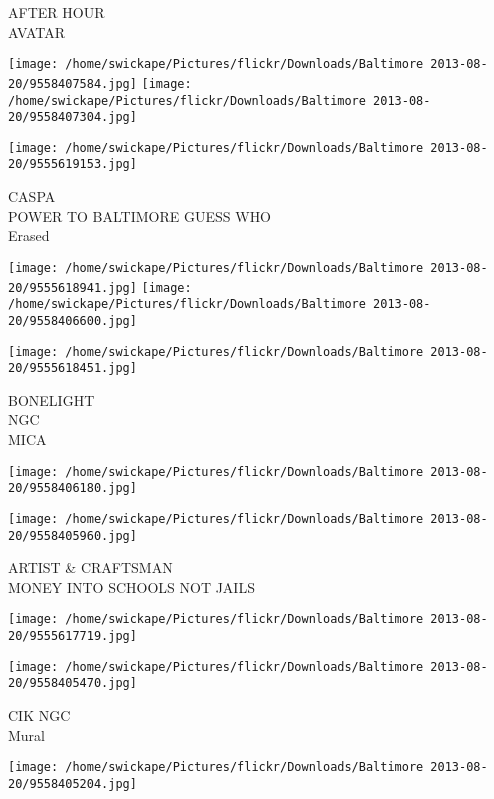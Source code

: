 \documentclass[10pt,letterpaper]{article}
\begin{document}
AFTER HOUR\\
AVATAR\\
\pagebreak

\texttt{[image: /home/swickape/Pictures/flickr/Downloads/Baltimore 2013-08-20/9558407584.jpg]}
\texttt{[image: /home/swickape/Pictures/flickr/Downloads/Baltimore 2013-08-20/9558407304.jpg]}

\vspace{0.25in}
\texttt{[image: /home/swickape/Pictures/flickr/Downloads/Baltimore 2013-08-20/9555619153.jpg]}

CASPA\\
POWER TO BALTIMORE GUESS WHO\\
Erased\\
\pagebreak

\texttt{[image: /home/swickape/Pictures/flickr/Downloads/Baltimore 2013-08-20/9555618941.jpg]}
\texttt{[image: /home/swickape/Pictures/flickr/Downloads/Baltimore 2013-08-20/9558406600.jpg]}

\texttt{[image: /home/swickape/Pictures/flickr/Downloads/Baltimore 2013-08-20/9555618451.jpg]}

BONELIGHT\\
NGC\\
MICA\\
\pagebreak

\texttt{[image: /home/swickape/Pictures/flickr/Downloads/Baltimore 2013-08-20/9558406180.jpg]}

\vspace{0.25in}
\texttt{[image: /home/swickape/Pictures/flickr/Downloads/Baltimore 2013-08-20/9558405960.jpg]}

ARTIST \& CRAFTSMAN\\
MONEY INTO SCHOOLS NOT JAILS\\
\pagebreak

\texttt{[image: /home/swickape/Pictures/flickr/Downloads/Baltimore 2013-08-20/9555617719.jpg]}

\vspace{0.25in}
\texttt{[image: /home/swickape/Pictures/flickr/Downloads/Baltimore 2013-08-20/9558405470.jpg]}

CIK NGC\\
Mural\\
\pagebreak

\texttt{[image: /home/swickape/Pictures/flickr/Downloads/Baltimore 2013-08-20/9558405204.jpg]}
\end{document}
